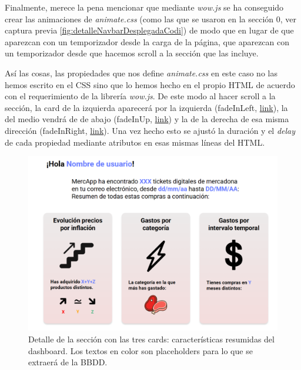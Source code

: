 \documentclass[a4paper,12pt]{report}
\begin{document}
	Finalmente, merece la pena mencionar que mediante \textit{wow.js} se ha conseguido crear las animaciones de \textit{animate.css} (como las que se usaron en la sección 0, ver captura previa \ref{fig:detalleNavbarDesplegadaCodi}) de modo que en lugar de que aparezcan con un temporizador desde la carga de la página, que aparezcan con un temporizador desde que hacemos scroll a la sección que las incluye.
	
	Así las cosas, las propiedades que nos define \textit{animate.css} en este caso no las hemos escrito en el CSS sino que lo hemos hecho en el propio HTML de acuerdo con el requerimiento de la librería \textit{wow.js}. De este modo al hacer scroll a la sección, la card de la izquierda aparecerá por la izquierda (fadeInLeft,  \href{https://github.com/blackcub3s/mercApp/blob/663360ea63eafd38c1fa052e7a994e22d7f0a5f6/APP%20WEB/__frontend__produccio__/app/dashboard.html#L130}{link}), la del medio vendrá de de abajo (fadeInUp,  \href{https://github.com/blackcub3s/mercApp/blob/663360ea63eafd38c1fa052e7a994e22d7f0a5f6/APP%20WEB/__frontend__produccio__/app/dashboard.html#L153}{link}) y la de la derecha de esa misma dirección (fadeInRight,  \href{https://github.com/blackcub3s/mercApp/blob/663360ea63eafd38c1fa052e7a994e22d7f0a5f6/APP%20WEB/__frontend__produccio__/app/dashboard.html#L173}{link}). Una vez hecho esto se ajustó la duración y el \textit{delay} de cada propiedad mediante atributos en esas mismas líneas del HTML.
	
	
	\FloatBarrier
	\begin{figure}[H]
		\centering
		\caption{Detalle de la sección con las tres cards: características resumidas del dashboard. Los textos en color son placeholders para lo que se extraerá de la BBDD.}
		\label{fig:s2caracteristiquesmercapp}
		\includegraphics[width=1\linewidth]{img/s2CaracteristiquesMercApp.png}
	\end{figure}
	\FloatBarrier
	
\end{document}
